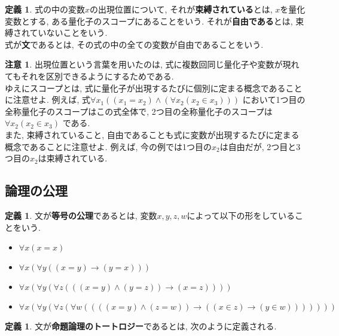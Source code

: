 \documentclass[a4paper]{bxjsarticle}
\theoremstyle{definition}
\newtheorem{defn}[thm]{定義}
\newtheorem{rem}[thm]{注意}
\begin{document}
    \begin{defn}
        式の中の変数$x$の出現位置について,  それが\textbf{束縛されている}とは, $x$を量化変数とする, ある量化子のスコープにあることをいう. それが\textbf{自由である}とは, 束縛されていないことをいう.\\
        式が\textbf{文}であるとは, その式の中の全ての変数が自由であることをいう.
    \end{defn}
    \begin{rem}
        出現位置という言葉を用いたのは, 式に複数回同じ量化子や変数が現れてもそれを区別できるようにするためである.\\
        ゆえにスコープとは, 式に量化子が出現するたびに個別に定まる概念であることに注意せよ. 例えば, 式$\forall x_1 ((x_1=x_2) \land (\forall x_2 (x_2 \in x_3)))$ において1つ目の全称量化子のスコープはこの式全体で, 2つ目の全称量化子のスコープは$\forall x_2 (x_2 \in x_3)$ である.\\
        また, 束縛されていること, 自由であることも式に変数が出現するたびに定まる概念であることに注意せよ. 例えば, 今の例では1つ目の$x_2$は自由だが, 2つ目と3つ目の$x_2$は束縛されている.
    \end{rem}
    \subsection{論理の公理}
    \begin{defn}
        文が\textbf{等号の公理}であるとは, 変数$x,y,z,w$によって以下の形をしていることをいう.
        \begin{itemize}
            \item $\forall x (x=x)$
            \item $\forall x (\forall y ((x=y) \to (y=x)))$
            \item $\forall x (\forall y (\forall z (((x=y) \land (y=z)) \to (x=z))))$
            \item $\forall x (\forall y (\forall z (\forall w ((((x=y)\land(z=w))\to((x\in z)\to(y\in w)))))))$
            
            
        \end{itemize}
    \end{defn}
    \begin{defn}
        文が\textbf{命題論理のトートロジー}であるとは, 次のように定義される.\\
        
    \end{defn}
    
\end{document}
